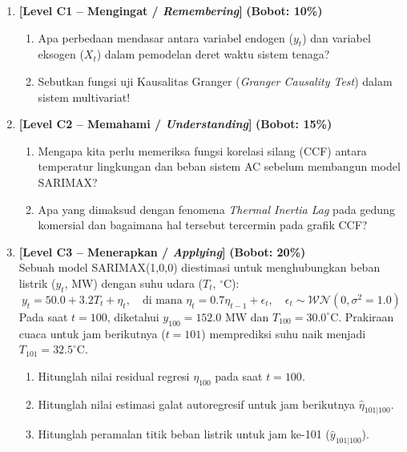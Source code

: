 \documentclass[11pt,a4paper]{article}
\begin{document}
\begin{enumerate}[leftmargin=1.5em, label=\textbf{Soal \arabic*.}]

    \item \textbf{[Level C1 -- Mengingat / \textit{Remembering}]} \hfill \textbf{(Bobot: 10\%)}
    \begin{enumerate}[label=\alph*.]
        \item Apa perbedaan mendasar antara variabel endogen ($y_t$) dan variabel eksogen ($X_t$) dalam pemodelan deret waktu sistem tenaga?
        \item Sebutkan fungsi uji Kausalitas Granger (\textit{Granger Causality Test}) dalam sistem multivariat!
    \end{enumerate}

    \vspace{0.3cm}

    \item \textbf{[Level C2 -- Memahami / \textit{Understanding}]} \hfill \textbf{(Bobot: 15\%)}
    \begin{enumerate}[label=\alph*.]
        \item Mengapa kita perlu memeriksa fungsi korelasi silang (CCF) antara temperatur lingkungan dan beban sistem AC sebelum membangun model SARIMAX?
        \item Apa yang dimaksud dengan fenomena \textit{Thermal Inertia Lag} pada gedung komersial dan bagaimana hal tersebut tercermin pada grafik CCF?
    \end{enumerate}

    \vspace{0.3cm}

    \item \textbf{[Level C3 -- Menerapkan / \textit{Applying}]} \hfill \textbf{(Bobot: 20\%)} \\
    Sebuah model SARIMAX(1,0,0) diestimasi untuk menghubungkan beban listrik ($y_t$, MW) dengan suhu udara ($T_t$, $^\circ\text{C}$):
    \begin{equation*}
        y_t = 50.0 + 3.2 T_t + \eta_t, \quad \text{di mana } \eta_t = 0.7 \eta_{t-1} + \epsilon_t, \quad \epsilon_t \sim \mathcal{WN}(0, \sigma^2=1.0)
    \end{equation*}
    Pada saat $t=100$, diketahui $y_{100} = 152.0$ MW dan $T_{100} = 30.0^\circ\text{C}$. Prakiraan cuaca untuk jam berikutnya ($t=101$) memprediksi suhu naik menjadi $T_{101} = 32.5^\circ\text{C}$.
    \begin{enumerate}[label=\alph*.]
        \item Hitunglah nilai residual regresi $\eta_{100}$ pada saat $t=100$.
        \item Hitunglah nilai estimasi galat autoregresif untuk jam berikutnya $\hat{\eta}_{101|100}$.
        \item Hitunglah peramalan titik beban listrik untuk jam ke-101 ($\hat{y}_{101|100}$).
    \end{enumerate}


\end{enumerate}
\end{document}
